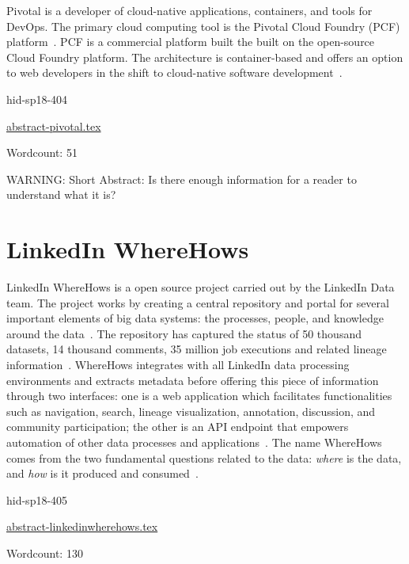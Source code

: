 Pivotal is a developer of cloud-native applications, containers, and
tools for DevOps. The primary cloud computing tool is the Pivotal
Cloud Foundry (PCF) platform~\cite{hid-sp18-404-Pivotal2017}. PCF is a
commercial platform built the built on the open-source Cloud Foundry
platform. The architecture is container-based and offers an option to
web developers in the shift to cloud-native software
development~\cite{hid-sp18-404-Darrow2016}.


\begin{IU}

hid-sp18-404

\href{https://github.com/cloudmesh-community/hid-sp18-404/blob/master//technology/abstract-pivotal.tex}{abstract-pivotal.tex}

 

Wordcount: 51

WARNING: Short Abstract: Is there enough information for a reader to understand what it is?

\end{IU}

\section{LinkedIn WhereHows}

LinkedIn WhereHows is a open source project carried out by the
LinkedIn Data team. The project works by creating a central repository
and portal for several important elements of big data systems: the
processes, people, and knowledge around the
data~\cite{hid-sp18-405-www-wherehows}. The repository has captured
the status of 50 thousand datasets, 14 thousand comments, 35 million
job executions and related lineage
information~\cite{hid-sp18-405-www-wherehows}. WhereHows integrates
with all LinkedIn data processing environments and extracts metadata
before offering this piece of information through two interfaces: one
is a web application which facilitates functionalities such as navigation, 
search, lineage visualization, annotation, discussion, and community 
participation; the other is an API endpoint that empowers automation of 
other data processes and applications~\cite{hid-sp18-405-www-wherehows}. 
The name WhereHows comes from the two fundamental questions related to 
the data: \textit{where} is the data, and \textit{how} is it produced and 
consumed~\cite{hid-sp18-405-githubwiki-wherehows}.


\begin{IU}

hid-sp18-405

\href{https://github.com/cloudmesh-community/hid-sp18-405/blob/master//technology/abstract-linkedinwherehows.tex}{abstract-linkedinwherehows.tex}

 

Wordcount: 130

\end{IU}

